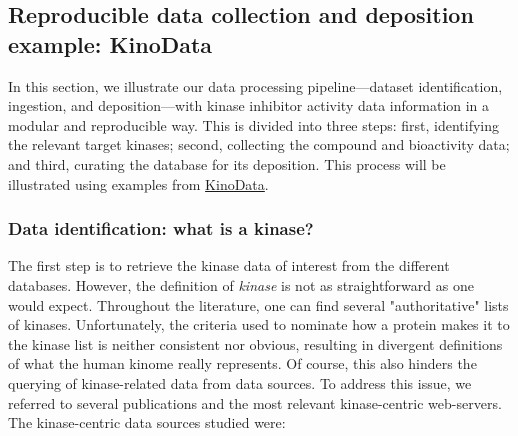 \documentclass[9pt,lessons, pubversion]{livecoms}
\begin{document}
\subsection{Reproducible data collection and deposition example: KinoData}

In this section, we illustrate our data processing pipeline---dataset identification, ingestion, and deposition---with kinase inhibitor activity data information in a modular and reproducible way. 
This is divided into three steps: first, identifying the relevant target kinases; second, collecting the compound and bioactivity data; and third, curating the database for its deposition. 
This process will be illustrated using examples from \href{https://github.com/openkinome/kinodata/}{KinoData}. 

\subsubsection{Data identification: what is a kinase?}
The first step is to retrieve the kinase data of interest from the different databases.
However, the definition of \textit{kinase} is not as straightforward as one would expect. 
Throughout the literature, one can find several "authoritative" lists of kinases. 
Unfortunately, the criteria used to nominate how a protein makes it to the kinase list is neither consistent nor obvious, resulting in divergent definitions of what the human kinome really represents. Of course, this also hinders the querying of kinase-related data from data sources. 
To address this issue, we referred to several publications and the most relevant kinase-centric web-servers.
The kinase-centric data sources studied were: 
\end{document}
